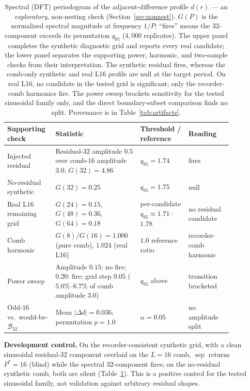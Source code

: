 \documentclass{article}
\begin{document}
\begin{table}[H]
\begin{tabular}{@{}>{\raggedright\arraybackslash}p{0.20\linewidth}
                    >{\raggedright\arraybackslash}p{0.34\linewidth}
                    >{\raggedright\arraybackslash}p{0.20\linewidth}
                    >{\raggedright\arraybackslash}p{0.18\linewidth}@{}}
\toprule
Supporting check & Statistic & Threshold / reference & Reading \\
\midrule
Injected residual & Residual-$32$ amplitude $0.5$ over comb-$16$ amplitude
$3.0$; $G(32){=}4.86$ & $q_{95}{=}1.74$ & fires \\
No-residual synthetic & $G(32){=}0.25$ & $q_{95}{=}1.75$ & null \\
Real L16 remaining grid & $G(24){=}0.15$, $G(48){=}0.36$,
$G(64){=}0.18$ & per-candidate $q_{95}\approx1.71$--$1.78$ & no residual candidate \\
Comb harmonic & $G(8)/G(16){=}1.000$ (pure comb), $1.024$ (real L16) &
$1.0$ reference ratio & recorder-comb harmonic \\
Power sweep & Amplitude $0.15$: no fire; $0.20$: fire; grid step $0.05$
($5.0\%$--$6.7\%$ of comb amplitude $3.0$) & $q_{95}$ above & transition bracketed \\
Odd-$16$ vs.\ would-be-$\mathcal B_{32}$ & Mean $|\Delta d|{=}0.036$;
permutation $p{=}1.0$ & $\alpha=0.05$ & no amplitude split \\
\bottomrule
\end{tabular}
\caption{Spectral (DFT) periodogram of the adjacent-difference profile
$d(r)$ --- an \emph{exploratory}, non-nesting check (Section~\ref{sec:nonnest}).
$G(P)$ is the normalized spectral magnitude at frequency $1/P$; ``fires''
means the $32$-component exceeds its permutation $q_{95}$ ($4{,}000$ replicates).
The upper panel completes the synthetic diagnostic grid and reports every real
candidate; the lower panel separates the supporting power, harmonic, and
two-sample checks from their interpretation. The synthetic residual fires,
whereas the comb-only synthetic and real L16 profile are null at the target
period. On real L16, no candidate in the tested grid is significant; only the
recorder-comb harmonics fire. The power sweep brackets sensitivity for the tested
sinusoidal family only, and the direct boundary-subset comparison finds no split.
Provenance is in Table~\ref{tab:artifacts}.}
\label{tab:spectral}
\end{table}

\textbf{Development control.} On the recorder-consistent synthetic grid, with a
clean sinusoidal residual-$32$ component overlaid on the $L{=}16$ comb,
$\operatorname{sep}$ returns $P^*{=}16$ (blind) while the spectral $32$-component
fires; on the no-residual synthetic comb, both are silent
(Table~\ref{tab:spectral}). This is a positive control for the tested sinusoidal
family, not validation against arbitrary residual shapes.
\end{document}
